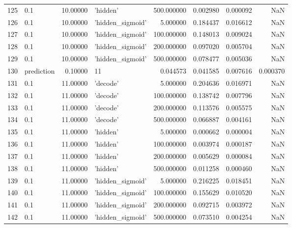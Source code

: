 \documentclass[10pt,a4paper]{article}
\begin{document}
\begin{tabular}{llrlrrrr}
125  &         0.1 &  10.00000 &           'hidden' &  500.000000 &  0.002980 &  0.000092 &       NaN \\
126  &         0.1 &  10.00000 &   'hidden\_sigmoid' &    5.000000 &  0.184437 &  0.016612 &       NaN \\
127  &         0.1 &  10.00000 &   'hidden\_sigmoid' &  100.000000 &  0.148013 &  0.009024 &       NaN \\
128  &         0.1 &  10.00000 &   'hidden\_sigmoid' &  200.000000 &  0.097020 &  0.005704 &       NaN \\
129  &         0.1 &  10.00000 &   'hidden\_sigmoid' &  500.000000 &  0.078477 &  0.005036 &       NaN \\
130  &  prediction &   0.10000 &                 11 &    0.044573 &  0.041585 &  0.007616 &  0.000370 \\
131  &         0.1 &  11.00000 &           'decode' &    5.000000 &  0.204636 &  0.016971 &       NaN \\
132  &         0.1 &  11.00000 &           'decode' &  100.000000 &  0.138742 &  0.007796 &       NaN \\
133  &         0.1 &  11.00000 &           'decode' &  200.000000 &  0.113576 &  0.005575 &       NaN \\
134  &         0.1 &  11.00000 &           'decode' &  500.000000 &  0.066887 &  0.004161 &       NaN \\
135  &         0.1 &  11.00000 &           'hidden' &    5.000000 &  0.000662 &  0.000004 &       NaN \\
136  &         0.1 &  11.00000 &           'hidden' &  100.000000 &  0.003974 &  0.000187 &       NaN \\
137  &         0.1 &  11.00000 &           'hidden' &  200.000000 &  0.005629 &  0.000084 &       NaN \\
138  &         0.1 &  11.00000 &           'hidden' &  500.000000 &  0.011258 &  0.000460 &       NaN \\
139  &         0.1 &  11.00000 &   'hidden\_sigmoid' &    5.000000 &  0.216225 &  0.018451 &       NaN \\
140  &         0.1 &  11.00000 &   'hidden\_sigmoid' &  100.000000 &  0.155629 &  0.010520 &       NaN \\
141  &         0.1 &  11.00000 &   'hidden\_sigmoid' &  200.000000 &  0.092715 &  0.003972 &       NaN \\
142  &         0.1 &  11.00000 &   'hidden\_sigmoid' &  500.000000 &  0.073510 &  0.004254 &       NaN \\

\end{tabular}
\end{document}
